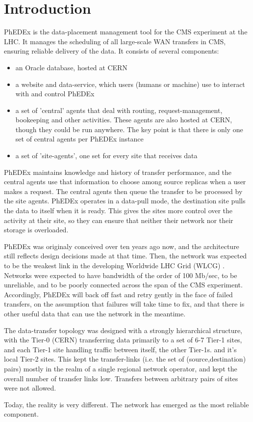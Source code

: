 \section{Introduction}
PhEDEx \cite{PhEDEx} is the data-placement management tool for the CMS \cite{CMS} experiment at 
the LHC. It manages the scheduling of all large-scale WAN transfers in CMS, 
ensuring reliable delivery of the data. It consists of several components:

\begin{itemize}
\item an Oracle database, hosted at CERN
\item a website and data-service, which users (humans or machine) use to interact with and control 
PhEDEx
\item a set of 'central' agents that deal with routing, request-management, bookeeping and other 
activities. These agents are also hosted at CERN, though they could be run anywhere. The 
key point is that there is only one set of central agents per PhEDEx instance
\item a set of 'site-agents', one set for every site that receives data
\end{itemize}

PhEDEx maintains knowledge and history of transfer 
performance, and the central agents use that information to choose among source replicas when a 
user makes a request. The central agents then queue the transfer to be processed by the site 
agents. PhEDEx operates in a data-pull mode, the destination site pulls the data to itself when it 
is ready. This gives the sites more control over the activity at their site, so they can ensure 
that neither their network nor their storage is overloaded.

PhEDEx was originaly conceived over ten years ago now, and the architecture still reflects design 
decisions made at that time. Then, the network was expected to be the weakest link in 
the developing Worldwide LHC Grid (WLCG) \cite{WLCG}. Networks were expected to have bandwidth of 
the order of 100 Mb/sec, to be unreliable, and to be poorly connected across the span of the CMS 
experiment. Accordingly, PhEDEx will back off fast and retry gently in the face of failed 
transfers, on the assumption that failures will take time to fix, and that there is other useful 
data that can use the network in the meantime.

The data-transfer topology was designed with a 
strongly hierarchical structure, with the Tier-0 (CERN) transferring data primarily to a set of 
6-7 Tier-1 sites, and each Tier-1 site handling traffic between itself, the other Tier-1s. and 
it's local Tier-2 sites. This kept the transfer-links (i.e. the set of (source,destination) pairs) 
mostly in the realm of a single regional network operator, and kept the overall number of transfer 
links low. Transfers between arbitrary pairs of sites were not allowed.

Today, the reality is very different. The network has emerged as the most reliable component.
